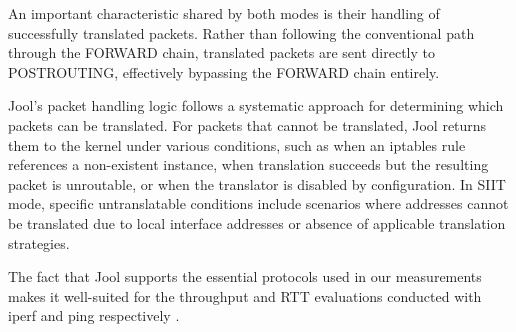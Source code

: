 An important characteristic shared by both modes is their handling of successfully translated packets. Rather than following the conventional path through the FORWARD chain, translated packets are sent directly to POSTROUTING, effectively bypassing the FORWARD chain entirely\cite{jool_introduction}.

Jool's packet handling logic follows a systematic approach for determining which packets can be translated. For packets that cannot be translated, Jool returns them to the kernel under various conditions, such as when an iptables rule references a non-existent instance, when translation succeeds but the resulting packet is unroutable, or when the translator is disabled by configuration\cite{jool_introduction}. In SIIT mode, specific untranslatable conditions include scenarios where addresses cannot be translated due to local interface addresses or absence of applicable translation strategies\cite{jool_introduction}.

The fact that Jool supports the essential protocols used in our measurements makes it well-suited for the throughput and RTT evaluations conducted with iperf and ping respectively \cite{jool_introduction}.
